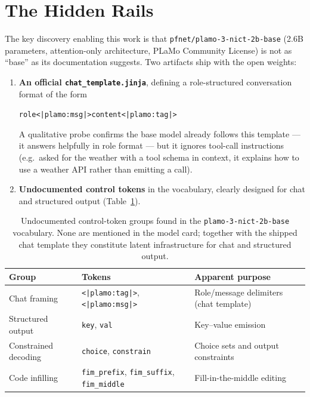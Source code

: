 \documentclass[10pt]{article}
\newcommand{\plamotok}[1]{\texttt{\textless|plamo:#1|\textgreater}}
\begin{document}
\section{The Hidden Rails}
\label{sec:rails}

The key discovery enabling this work is that \texttt{pfnet/plamo-3-nict-2b-base} (2.6B
parameters, attention-only architecture, PLaMo Community License) is not as ``base'' as
its documentation suggests. Two artifacts ship with the open weights:

\begin{enumerate}
\item \textbf{An official \texttt{chat\_template.jinja}}, defining a role-structured
  conversation format of the form
  \begin{center}
  \texttt{role\plamotok{msg}content\plamotok{tag}}
  \end{center}
  A qualitative probe confirms the base model already follows this template --- it answers
  helpfully in role format --- but it ignores tool-call instructions (e.g.\ asked for the
  weather with a tool schema in context, it explains how to use a weather API rather than
  emitting a call).
\item \textbf{Undocumented control tokens} in the vocabulary, clearly designed for chat
  and structured output (Table~\ref{tab:tokens}).
\end{enumerate}

\begin{table}[ht]
\centering
\caption{Undocumented control-token groups found in the \texttt{plamo-3-nict-2b-base}
vocabulary. None are mentioned in the model card; together with the shipped chat template
they constitute latent infrastructure for chat and structured output.}
\label{tab:tokens}
\small
\begin{tabular}{lll}
\toprule
Group & Tokens & Apparent purpose \\
\midrule
Chat framing      & \plamotok{tag}, \plamotok{msg} & Role/message delimiters (chat template) \\
Structured output & \texttt{key}, \texttt{val} & Key--value emission \\
Constrained decoding & \texttt{choice}, \texttt{constrain} & Choice sets and output constraints \\
Code infilling    & \texttt{fim\_prefix}, \texttt{fim\_suffix}, \texttt{fim\_middle} & Fill-in-the-middle editing \\
\bottomrule
\end{tabular}
\end{table}
\end{document}

